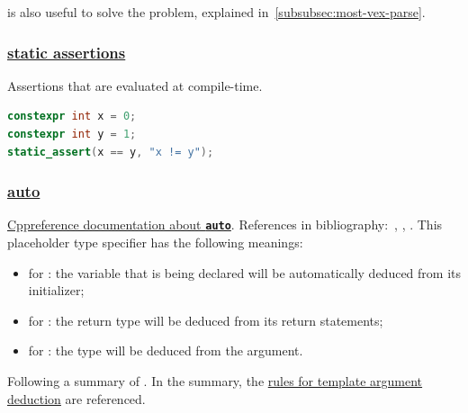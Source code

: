  is also useful to solve the 
 problem, explained in~\ref{subsubsec:most-vex-parse}.

\subsubsection{\href{https://github.com/AnthonyCalandra/modern-cpp-features/tree/master\#static-assertions}
{static assertions}}
Assertions that are evaluated at compile-time.
\begin{lstlisting}[language=C++]
constexpr int x = 0;
constexpr int y = 1;
static_assert(x == y, "x != y");
\end{lstlisting}

\subsubsection{\href{https://github.com/AnthonyCalandra/modern-cpp-features/tree/master\#auto}
                    {auto}}
\label{subsubsec:c++auto}
\href{https://en.cppreference.com/w/cpp/language/auto}{Cppreference documentation about \texttt{\textbf{auto}}}.
\newline
References in bibliography:~\cite{gotw-auto-variablesI}, \cite{gotw-auto-variablesII},
\cite{gotw-almost-always-auto}.
\newline
This placeholder type specifier has the following meanings:
\begin{itemize}
    \item for : \newline
    the variable that is being declared will be automatically deduced 
    from its initializer;
    \item for : \newline
    the return type will be deduced from its return statements;
    \item for : \newline
    the type will be deduced from the argument.
\end{itemize}

Following a summary of . 
\newline
In the summary, the 
\href{https://en.cppreference.com/w/cpp/language/template_argument_deduction#Other_contexts}{rules for template argument deduction} 
are referenced.

